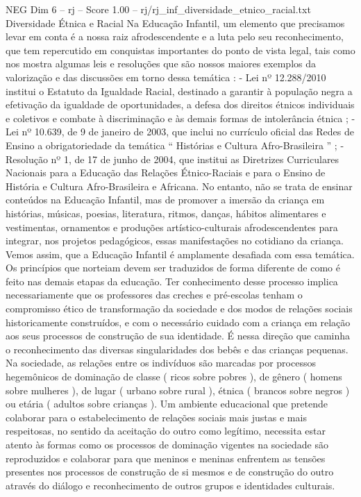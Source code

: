 \begin{textsample}{NEG Dim 6 – rj – Score 1.00 – rj/rj\_inf\_diversidade\_etnico\_racial.txt}  \label{ex:f6_neg_016}
Diversidade Étnica e Racial Na Educação Infantil, um elemento que precisamos levar em conta é a nossa raiz afrodescendente e a luta pelo seu reconhecimento, que tem repercutido em conquistas importantes do ponto de vista legal, tais como nos mostra algumas leis e resoluções que são nossos maiores exemplos da valorização e das discussões em torno dessa temática : - Lei nº 12.288/2010 institui o Estatuto da Igualdade Racial, destinado a garantir à população negra a efetivação da igualdade de oportunidades, a defesa dos direitos étnicos individuais e coletivos e combate à discriminação e às demais formas de intolerância étnica ; - Lei nº 10.639, de 9 de janeiro de 2003, que inclui no currículo oficial das Redes de Ensino a obrigatoriedade da temática “ Histórias e Cultura Afro-Brasileira ” ; - Resolução nº 1, de 17 de junho de 2004, que institui as Diretrizes Curriculares Nacionais para a Educação das Relações Étnico-Raciais e para o Ensino de História e Cultura Afro-Brasileira e Africana.
No entanto, não se trata de ensinar conteúdos na Educação Infantil, mas de promover a imersão da criança em histórias, músicas, poesias, literatura, ritmos, danças, hábitos alimentares e vestimentas, ornamentos e produções artístico-culturais afrodescendentes para integrar, nos projetos pedagógicos, essas manifestações no cotidiano da criança.
Vemos assim, que a Educação Infantil é amplamente desafiada com essa temática.
Os princípios que norteiam devem ser traduzidos de forma diferente de como é feito nas demais etapas da educação.
Ter conhecimento desse processo implica necessariamente que os professores das creches e pré-escolas tenham o compromisso ético de transformação da sociedade e dos modos de relações sociais historicamente construídos, e com o necessário cuidado com a criança em relação aos seus processos de construção de sua identidade.
É nessa direção que caminha o reconhecimento das diversas singularidades dos bebês e das crianças pequenas.
Na sociedade, as relações entre os indivíduos são marcadas por processos hegemônicos de dominação de classe ( ricos sobre pobres ), de gênero ( homens sobre mulheres ), de lugar ( urbano sobre rural ), étnica ( brancos sobre negros ) ou etária ( adultos sobre crianças ).
Um ambiente educacional que pretende colaborar para o estabelecimento de relações sociais mais justas e mais respeitosas, no sentido da aceitação do outro como legítimo, necessita estar atento às formas como os processos de dominação vigentes na sociedade são reproduzidos e colaborar para que meninos e meninas enfrentem as tensões presentes nos processos de construção de si mesmos e de construção do outro através do diálogo e reconhecimento de outros grupos e identidades culturais.

\end{textsample}
